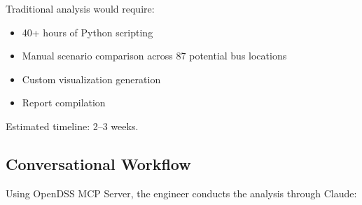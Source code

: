 \documentclass[review]{elsarticle}
\begin{document}
Traditional analysis would require:
\begin{itemize}
    \item 40+ hours of Python scripting
    \item Manual scenario comparison across 87 potential bus locations
    \item Custom visualization generation
    \item Report compilation
\end{itemize}

Estimated timeline: 2--3 weeks.

\subsection{Conversational Workflow}

Using OpenDSS MCP Server, the engineer conducts the analysis through Claude:
\end{document}
